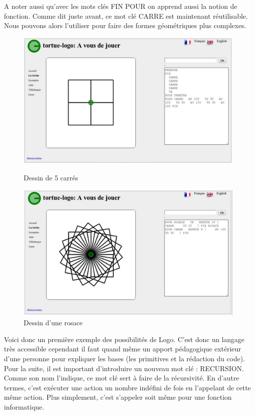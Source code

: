A noter aussi qu'avec les mots clés FIN POUR on apprend aussi la notion de fonction. Comme dit juste avant, ce mot clé CARRE est maintenant réutilisable. Nous pouvons alors l'utiliser pour faire des formes géométriques plus complexes.

\begin{figure}[!htb]
  \centering
  \begin{minipage}[b]{0.45\textwidth}
    \includegraphics[width=\textwidth]{images/logo2.PNG}
    \caption{Dessin de 5 carrés}
  \end{minipage}
  \hfill
  \begin{minipage}[b]{0.45\textwidth}
    \includegraphics[width=\textwidth]{images/logo3.PNG}
    \caption{Dessin d'une rosace}
  \end{minipage}
\end{figure}

Voici donc un première exemple des possibilités de Logo. C'est donc un langage très accessible cependant il faut quand même un apport pédagogique extérieur d'une personne pour expliquer les bases (les primitives et la rédaction du code). Pour la suite, il est important d'introduire un nouveau mot clé : RECURSION. Comme son nom l'indique, ce mot clé sert à faire de la récursivité. En d'autre termes, c'est exécuter une action un nombre indéfini de fois en l'appelant de cette même action. Plus simplement, c'est s'appeler soit même pour une fonction informatique.

